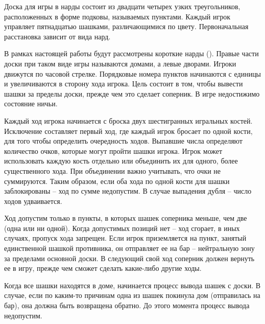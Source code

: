 Доска для игры в нарды состоит из двадцати четырех узких треугольников, расположенных в форме подковы, называемых пунктами. Каждый игрок управляет пятнадцатью шашками, различающимися по цвету. Первоначальная расстановка зависит от вида нард.

В рамках настоящей работы будут рассмотрены короткие нарды (). Правые части доски при таком виде игры называются домами, а левые дворами. Игроки движутся по часовой стрелке. Порядковые номера пунктов начинаются с единицы и увеличиваются в сторону хода игрока. Цель состоит в том, чтобы вывести шашки за пределы доски, прежде чем это сделает соперник. В игре недостижимо состояние ничьи.


Каждый ход игрока начинается с броска двух шестигранных игральных костей. Исключение составляет первый ход, где каждый игрок бросает по одной кости, для того чтобы определить очередность ходов. Выпавшие числа определяют количество очков, которые могут пройти шашки игрока. Игрок может использовать каждую кость отдельно или объединить их для одного, более существенного хода. При объединении важно учитывать, что очки не суммируются. Таким образом, если оба хода по одной кости для шашки заблокированы -- ход по сумме недопустим. В случае выпадения дубля -- число ходов удваивается.

Ход допустим только в пункты, в которых шашек соперника меньше, чем две (одна или ни одной). Когда допустимых позиций нет -- ход сгорает, в иных случаях, пропуск хода запрещен. Если игрок приземляется на пункт, занятый единственной шашкой противника, он отправляет ее на бар -- нейтральную зону за пределами основной доски. В следующий свой ход соперник должен вернуть ее в игру, прежде чем сможет сделать какие-либо другие ходы.

Когда все шашки находятся в доме, начинается процесс вывода шашек с доски. В случае, если по каким-то причинам одна из шашек покинула дом (отправилась на бар), она должна быть возвращена обратно. До этого момента процесс вывода недопустим.
